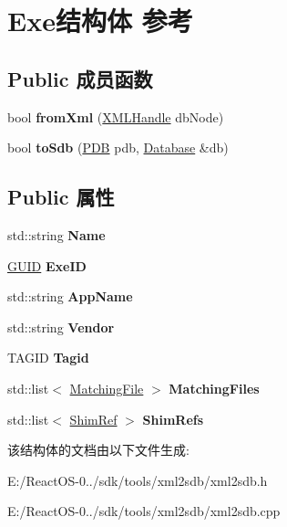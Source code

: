 \hypertarget{struct_exe}{}\section{Exe结构体 参考}
\label{struct_exe}
\subsection*{Public 成员函数}
\begin{DoxyCompactItemize}
\item 
\mbox{\label{struct_exe_a41e8f87e9c60527811c9d44036b35a36}} 
bool {\bfseries from\+Xml} (\hyperlink{classtinyxml2_1_1_x_m_l_handle}{X\+M\+L\+Handle} db\+Node)
\item 
\mbox{\label{struct_exe_a76e509e89ada615547abd508a84e8c6a}} 
bool {\bfseries to\+Sdb} (\hyperlink{struct___d_b}{P\+DB} pdb, \hyperlink{struct_database}{Database} \&db)
\end{DoxyCompactItemize}
\subsection*{Public 属性}
\begin{DoxyCompactItemize}
\item 
\mbox{\label{struct_exe_a5c375c387a02a910ff81f20037b9469e}} 
std\+::string {\bfseries Name}
\item 
\mbox{\label{struct_exe_a793fe47c9fedb38d2d5cc734b39e1de5}} 
\hyperlink{interface_g_u_i_d}{G\+U\+ID} {\bfseries Exe\+ID}
\item 
\mbox{\label{struct_exe_a5ca10eabba8d0cbdf4389f056622a6e5}} 
std\+::string {\bfseries App\+Name}
\item 
\mbox{\label{struct_exe_ad2482ee74668da5e44067f51fd6d7582}} 
std\+::string {\bfseries Vendor}
\item 
\mbox{\label{struct_exe_a521a3380c984e8e8e9d52c879fb97174}} 
T\+A\+G\+ID {\bfseries Tagid}
\item 
\mbox{\label{struct_exe_a3b40abd736a634fca9a86e3cc424708e}} 
std\+::list$<$ \hyperlink{struct_matching_file}{Matching\+File} $>$ {\bfseries Matching\+Files}
\item 
\mbox{\label{struct_exe_a7db2021aa8dbf609f3fad828f2403613}} 
std\+::list$<$ \hyperlink{struct_shim_ref}{Shim\+Ref} $>$ {\bfseries Shim\+Refs}
\end{DoxyCompactItemize}


该结构体的文档由以下文件生成\+:\begin{DoxyCompactItemize}
\item 
E\+:/\+React\+O\+S-\/0../sdk/tools/xml2sdb/xml2sdb.\+h\item 
E\+:/\+React\+O\+S-\/0../sdk/tools/xml2sdb/xml2sdb.\+cpp\end{DoxyCompactItemize}
